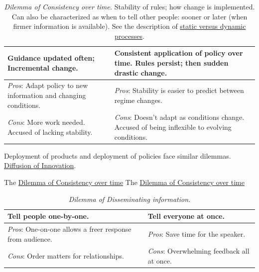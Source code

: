 \begin{center}
\begin{table}[H] %
\begin{tabular}{ | m{\dilemmatablewidth}| m{\dilemmatablewidth} | } 
  \hline
  \textbf{Guidance updated often; Incremental change.} & 
  \textbf{Consistent application of policy over time. Rules persist; then sudden drastic change.} \\ 
  \hline
  \textit{Pros}: Adapt policy to new information and changing conditions. &
  \textit{Pros}: Stability is easier to predict between regime changes.  \\
  \hline
  \textit{Cons}: More work needed. Accused of lacking stability. & 
  \textit{Cons}: Doesn't adapt as conditions change. Accused of being inflexible to evolving conditions. \\
  \hline
\end{tabular}
\caption{
\textit{Dilemma of Consistency over time.} 
Stability of rules; how change is implemented. Can also be characterized as when to tell other people: sooner or later (when firmer information is available).
See the description of 
\hyperref[sec:static-dynamic-processes]{static versus dynamic processes}.
}
\label{table:consistency}
\end{table}
\end{center}

Deployment of products and deployment of policies face similar dilemmas. \href{https://en.wikipedia.org/wiki/Diffusion_of_innovations}{Diffusion of Innovation}.

The \href{table:consistency}{Dilemma of Consistency over time}
The \href{table:consistency}{Dilemma of Consistency over time}


\begin{center}
\begin{table}[H] %
\begin{tabular}{ | m{\dilemmatablewidth}| m{\dilemmatablewidth} | } 
  \hline
  \textbf{Tell people one-by-one.} & 
  \textbf{Tell everyone at once.} \\ 
  \hline
  \textit{Pros}: One-on-one allows a freer response from audience. &
  \textit{Pros}: Save time for the speaker. \\
  \hline
  \textit{Cons}: Order matters for relationships. & 
  \textit{Cons}: Overwhelming feedback all at once. \\  
  \hline
\end{tabular}
\caption{
\textit{Dilemma of Disseminating information.}
}
\label{table:disseminate_one-by-one}
\end{table}
\end{center}

